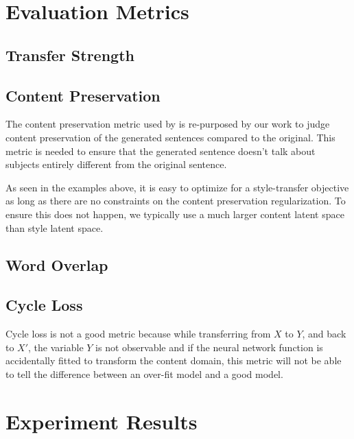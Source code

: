\section{Evaluation Metrics}


\subsection{Transfer Strength}

\subsection{Content Preservation} \label{ssec:content-preservation-metric}

The content preservation metric used by \cite{fu2017style} is re-purposed by our work to judge content preservation of the generated sentences compared to the original. This metric is needed to ensure that the generated sentence doesn't talk about subjects entirely different from the original sentence.


As seen in the examples above, it is easy to optimize for a style-transfer objective as long as there are no constraints on the content preservation regularization. To ensure this does not happen, we typically use a much larger content latent space than style latent space.

\subsection{Word Overlap}

\subsection{Cycle Loss}

Cycle loss is not a good metric because while transferring from $X$ to $Y$, and back to $X'$, the variable $Y$ is not observable and if the neural network function is accidentally fitted to transform the content domain, this metric will not be able to tell the difference between an over-fit model and a good model.

\section{Experiment Results}

